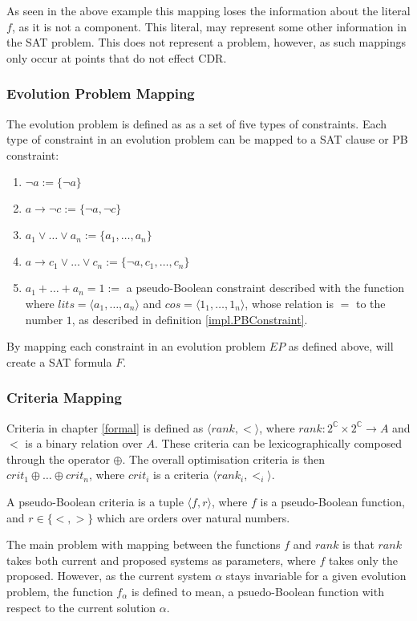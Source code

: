 As seen in the above example this mapping loses the information about the literal $f$, as it is not a component.
This literal, may represent some other information in the SAT problem.
This does not represent a problem, however, as such mappings only occur at points that do not effect CDR.

\subsubsection{Evolution Problem Mapping}
The evolution problem is defined as as a set of five types of constraints.
Each type of constraint in an evolution problem can be mapped to a SAT clause or PB constraint:
\begin{enumerate}
  \item $\neg a := \{\neg a\}$
  \item $a \rightarrow \neg c := \{\neg a, \neg c\}$ 
  \item $a_1 \vee \ldots \vee a_n := \{a_1, \ldots,  a_n\}$ 
  \item $a \rightarrow c_1 \vee \ldots \vee c_n := \{\neg a, c_1, \ldots, c_n\}$
  \item $a_1 + \ldots + a_n = 1 := $ a pseudo-Boolean constraint described with the function where $lits = \langle a_1 ,\ldots , a_n\rangle$ and $cos = \langle 1_1,\ldots,1_n \rangle$,
  whose relation is $=$ to the number $1$, as described in definition \ref{impl.PBConstraint}.  
\end{enumerate}

By mapping each constraint in an evolution problem $EP$ as defined above, will create a SAT formula $F$.

\subsubsection{Criteria Mapping}
Criteria in chapter \ref{formal} is defined as $\langle rank,< \rangle$, where $rank : 2^{\mathbb{C}} \times 2^{\mathbb{C}} \rightarrow A$ and $<$ is a binary relation over $A$.
These criteria can be lexicographically composed through the operator $\oplus$.
The overall optimisation criteria is then $crit_1 \oplus \ldots \oplus crit_n$, where $crit_i$ is a criteria $\langle rank_i,<_i \rangle$.

A pseudo-Boolean criteria is a tuple $\langle f, r \rangle$, where $f$ is a pseudo-Boolean function, and $r \in \{<,>\}$ which are orders over natural numbers.

The main problem with mapping between the functions $f$ and $rank$ is that $rank$ takes both current and proposed systems as parameters, where $f$ takes only the proposed.
However, as the current system $\alpha$ stays invariable for a given evolution problem, 
the function $f_{\alpha}$ is defined to mean, a psuedo-Boolean function with respect to the current solution $\alpha$.

